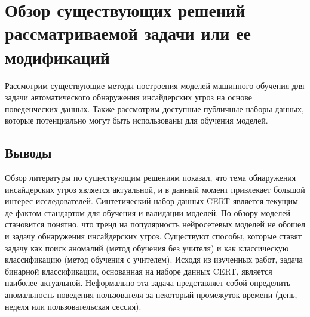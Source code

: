 \chapter{Обзор существующих решений рассматриваемой задачи или ее модификаций}

Рассмотрим существующие методы построения моделей машинного обучения для задачи автоматического обнаружения инсайдерских угроз на основе поведенческих данных. Также рассмотрим доступные публичные наборы данных, которые потенциально могут быть использованы для обучения моделей.





\section{Выводы}

Обзор литературы по существующим решениям показал, что тема обнаружения инсайдерских угроз является актуальной, и в данный момент привлекает большой интерес исследователей. Синтетический набор данных CERT является текущим де-фактом стандартом для обучения и валидации моделей. По обзору моделей становится понятно, что тренд на популярность нейросетевых моделей не обошел и задачу обнаружения инсайдерских угроз. Существуют способы, которые ставят задачу как поиск аномалий (метод обучения без учителя) и как классическую классификацию (метод обучения с учителем). Исходя из изученных работ, задача бинарной классификации, основанная на наборе данных CERT, является наиболее актуальной. Неформально эта задача представляет собой определить аномальность поведения пользователя за некоторый промежуток времени (день, неделя или пользовательская сессия).
